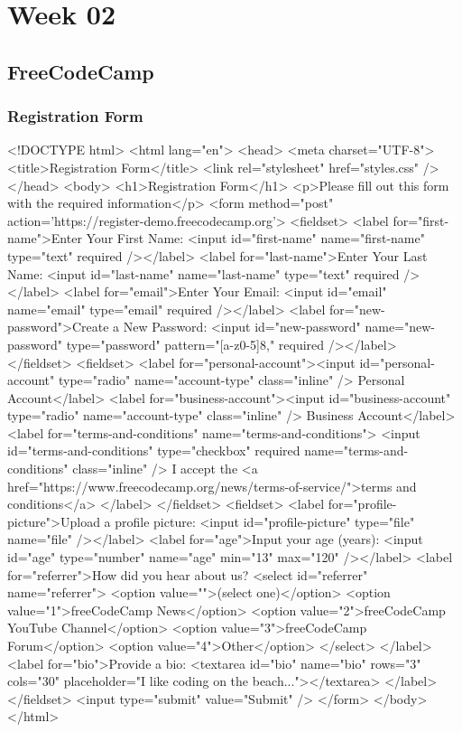 \chapter{Week 02}
\section{FreeCodeCamp}
\subsection{Registration Form}
\begin{html}
<!DOCTYPE html>
<html lang="en">
  <head>
    <meta charset="UTF-8">
    <title>Registration Form</title>
    <link rel="stylesheet" href="styles.css" />
  </head>
  <body>
    <h1>Registration Form</h1>
    <p>Please fill out this form with the required information</p>
    <form method="post" action='https://register-demo.freecodecamp.org'>
      <fieldset>
        <label for="first-name">Enter Your First Name: <input id="first-name" name="first-name" type="text" required /></label>
        <label for="last-name">Enter Your Last Name: <input id="last-name" name="last-name" type="text" required /></label>
        <label for="email">Enter Your Email: <input id="email" name="email" type="email" required /></label>
        <label for="new-password">Create a New Password: <input id="new-password" name="new-password" type="password" pattern="[a-z0-5]{8,}" required /></label>
      </fieldset>
      <fieldset>
        <label for="personal-account"><input id="personal-account" type="radio" name="account-type" class="inline" /> Personal Account</label>
        <label for="business-account"><input id="business-account" type="radio" name="account-type" class="inline" /> Business Account</label>
        <label for="terms-and-conditions" name="terms-and-conditions">
          <input id="terms-and-conditions" type="checkbox" required name="terms-and-conditions" class="inline" /> I accept the <a href="https://www.freecodecamp.org/news/terms-of-service/">terms and conditions</a>
        </label>
      </fieldset>
      <fieldset>
        <label for="profile-picture">Upload a profile picture: <input id="profile-picture" type="file" name="file" /></label>
        <label for="age">Input your age (years): <input id="age" type="number" name="age" min="13" max="120" /></label>
        <label for="referrer">How did you hear about us?
          <select id="referrer" name="referrer">
            <option value="">(select one)</option>
            <option value="1">freeCodeCamp News</option>
            <option value="2">freeCodeCamp YouTube Channel</option>
            <option value="3">freeCodeCamp Forum</option>
            <option value="4">Other</option>
          </select>
        </label>
        <label for="bio">Provide a bio:
          <textarea id="bio" name="bio" rows="3" cols="30" placeholder="I like coding on the beach..."></textarea>
        </label>
      </fieldset>
      <input type="submit" value="Submit" />
    </form>
  </body>
</html>
\end{html}
